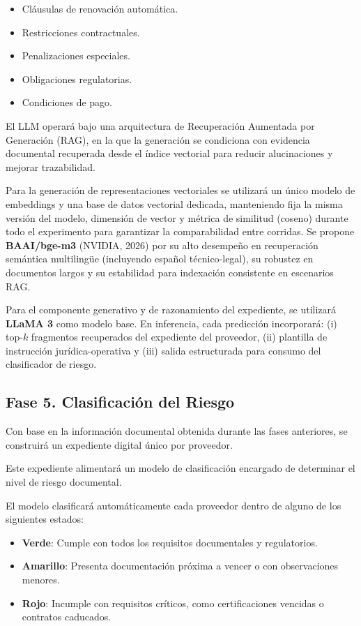 \documentclass[12pt]{article}
\begin{document}
\begin{itemize}
    \item Cláusulas de renovación automática.
    \item Restricciones contractuales.
    \item Penalizaciones especiales.
    \item Obligaciones regulatorias.
    \item Condiciones de pago.
\end{itemize}

El LLM operará bajo una arquitectura de Recuperación Aumentada por Generación (RAG), en la que la generación se condiciona con evidencia documental recuperada desde el índice vectorial para reducir alucinaciones y mejorar trazabilidad.

Para la generación de representaciones vectoriales se utilizará un único modelo de embeddings y una base de datos vectorial dedicada, manteniendo fija la misma versión del modelo, dimensión de vector y métrica de similitud (coseno) durante todo el experimento para garantizar la comparabilidad entre corridas. Se propone \textbf{BAAI/bge-m3} (NVIDIA, 2026) por su alto desempeño en recuperación semántica multilingüe (incluyendo español técnico-legal), su robustez en documentos largos y su estabilidad para indexación consistente en escenarios RAG.

Para el componente generativo y de razonamiento del expediente, se utilizará \textbf{LLaMA 3} como modelo base. En inferencia, cada predicción incorporará: (i) top-$k$ fragmentos recuperados del expediente del proveedor, (ii) plantilla de instrucción jurídica-operativa y (iii) salida estructurada para consumo del clasificador de riesgo.

\subsection{Fase 5. Clasificación del Riesgo}

Con base en la información documental obtenida durante las fases anteriores, se construirá un expediente digital único por proveedor.

Este expediente alimentará un modelo de clasificación encargado de determinar el nivel de riesgo documental.

El modelo clasificará automáticamente cada proveedor dentro de alguno de los siguientes estados:

\begin{itemize}
    \item \textbf{Verde}: Cumple con todos los requisitos documentales y regulatorios.
    \item \textbf{Amarillo}: Presenta documentación próxima a vencer o con observaciones menores.
    \item \textbf{Rojo}: Incumple con requisitos críticos, como certificaciones vencidas o contratos caducados.
\end{itemize}
\end{document}
